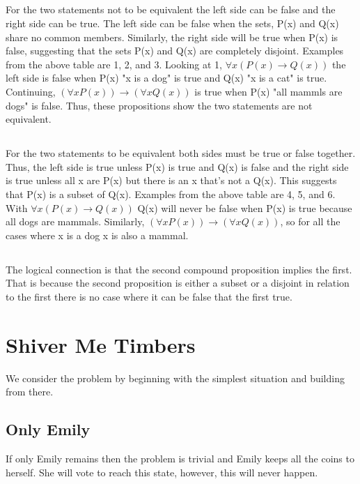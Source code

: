 \documentclass[11pt]{article}
\begin{document}
\subsection{} %
For the two statements not to be equivalent the left side can be false and the right side can be true. The left side can be false when the sets, P(x) and Q(x) share no common members. Similarly, the right side will be true when P(x) is false, suggesting that the sets P(x) and Q(x) are completely disjoint. Examples from the above table are 1, 2, and 3. Looking at 1, $\forall x(P(x) \rightarrow Q(x))$ the left side is false when P(x) "x is a dog" is true and Q(x) "x is a cat" is true.  Continuing, $(\forall xP(x)) \rightarrow (\forall xQ(x))$ is true when P(x) "all mammls are dogs" is false. Thus, these propositions show the two statements are not equivalent. 

\subsection{} %
For the two statements to be equivalent both sides must be true or false together. Thus, the left side is true unless P(x) is true and Q(x) is false and the right side is true unless all x are P(x) but there is an x that's not a Q(x). This suggests that P(x) is a subset of Q(x). Examples from the above table are 4, 5, and 6. With $\forall x(P(x) \rightarrow Q(x))$ Q(x) will never be false when P(x) is true because all dogs are mammals. Similarly, $(\forall xP(x)) \rightarrow (\forall xQ(x))$, so for all the cases  where x is a dog x is also a mammal.

\subsection{} %
The logical connection is that the second compound proposition implies the first. That is because the second proposition is either a subset or a disjoint in relation to the first there is no case where it can be false that the first true. 

\section{Shiver Me Timbers} %
We consider the problem by beginning with the simplest situation and building from there. 

\subsection{Only Emily}
If only Emily remains then the problem is trivial and Emily keeps all the coins to herself. She will vote to reach this state, however, this will never happen. 
\end{document}
